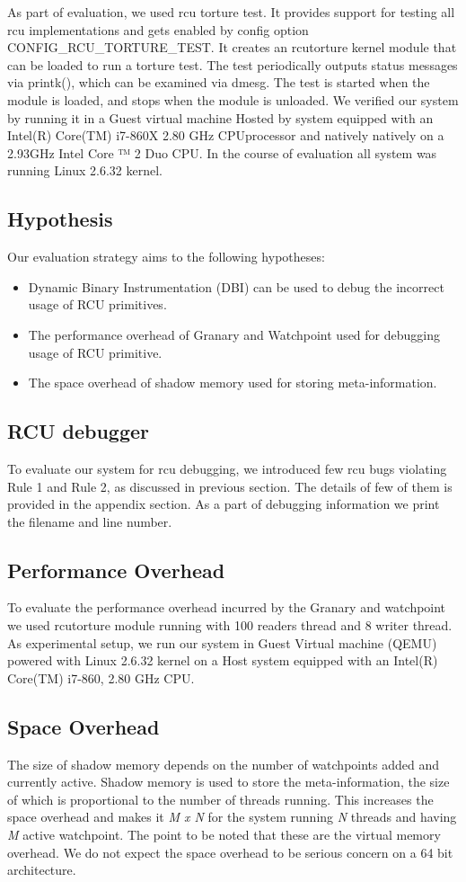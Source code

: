 As part of evaluation, we used rcu torture test. It provides support for testing all rcu implementations and gets enabled by config option CONFIG\_RCU\_TORTURE\_TEST. It creates an rcutorture kernel module that can be loaded to run a torture test.  The test periodically outputs status messages via printk(), which can be examined via dmesg. The test is started when the module is loaded, and stops when the module is unloaded. We veriﬁed our system by running it in a Guest virtual machine Hosted by system equipped with an Intel(R) Core(TM) i7-860X 2.80 GHz CPUprocessor and natively natively on a 2.93GHz Intel Core ™ 2 Duo CPU. In the course of evaluation all system was running Linux 2.6.32 kernel.

\subsection{Hypothesis}
Our evaluation strategy aims to  the following hypotheses:
\begin{itemize}
	\item Dynamic Binary Instrumentation (DBI) can be used to debug the incorrect usage of RCU primitives.
	\item The performance overhead of Granary and Watchpoint used for debugging usage of RCU primitive.
	\item The space overhead of shadow memory used for storing meta-information.
\end{itemize}

\subsection {RCU debugger}
To evaluate our system for rcu debugging, we introduced few rcu bugs violating Rule 1 and Rule 2, as discussed in previous section. The details of few of them is provided in the appendix section. As a part of debugging information we print the filename and line number. 

\subsection{Performance Overhead}
To evaluate the performance overhead incurred by the Granary and watchpoint we used rcutorture module running with 100 readers thread and 8 writer thread. As experimental setup, we run our system in Guest Virtual machine (QEMU) powered with Linux 2.6.32 kernel on a Host system equipped with an Intel(R) Core(TM) i7-860, 2.80 GHz CPU.

\subsection{Space Overhead}
The size of shadow memory depends on the number of watchpoints added and currently active. Shadow memory is used to store the meta-information, the size of which is proportional to the number of threads running. This increases the space overhead and makes it \emph{M x N} for the system running \emph{N} threads and having \emph{M} active watchpoint. The point to be noted that these are the virtual memory overhead. We do not expect the space overhead to be serious concern on a 64 bit architecture.    

